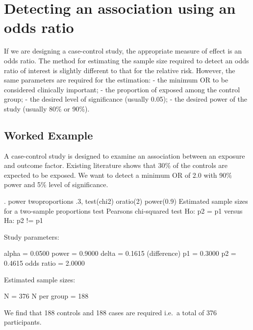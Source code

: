 \documentclass[
]{memoir}
\newenvironment{Shaded}{\begin{snugshade}}{\end{snugshade}}
\newcommand{\NormalTok}[1]{#1}
\begin{document}
\hypertarget{detecting-an-association-using-an-odds-ratio}{%
\section{Detecting an association using an odds ratio}\label{detecting-an-association-using-an-odds-ratio}}

If we are designing a case-control study, the appropriate measure of effect is an odds ratio. The method for estimating the sample size required to detect an odds ratio of interest is slightly different to that for the relative risk. However, the same parameters are required for the estimation:
- the minimum OR to be considered clinically important;
- the proportion of exposed among the control group;
- the desired level of significance (usually 0.05);
- the desired power of the study (usually 80\% or 90\%).

\hypertarget{worked-example-11}{%
\subsection{Worked Example}\label{worked-example-11}}

A case-control study is designed to examine an association between an exposure and outcome factor. Existing literature shows that 30\% of the controls are expected to be exposed. We want to detect a minimum OR of 2.0 with 90\% power and 5\% level of significance.

\begin{Shaded}
\begin{Highlighting}[]
\NormalTok{. power twoproportions .3, test(chi2) oratio(2) power(0.9)}
\NormalTok{Estimated sample sizes for a two{-}sample proportions test}
\NormalTok{Pearson\textquotesingle{}s chi{-}squared test }
\NormalTok{Ho: p2 = p1  versus  Ha: p2 != p1}

\NormalTok{Study parameters:}

\NormalTok{        alpha =    0.0500}
\NormalTok{        power =    0.9000}
\NormalTok{        delta =    0.1615  (difference)}
\NormalTok{           p1 =    0.3000}
\NormalTok{           p2 =    0.4615}
\NormalTok{   odds ratio =    2.0000}

\NormalTok{Estimated sample sizes:}

\NormalTok{            N =       376}
\NormalTok{  N per group =       188}
\end{Highlighting}
\end{Shaded}

We find that 188 controls and 188 cases are required i.e.~a total of 376 participants.
\end{document}
